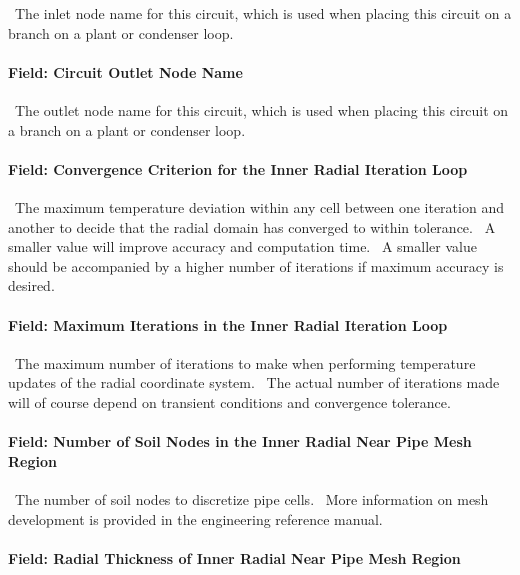 ~The inlet node name for this circuit, which is used when placing this circuit on a branch on a plant or condenser loop.

\paragraph{Field: Circuit Outlet Node Name}\label{field-circuit-outlet-node-name}

~The outlet node name for this circuit, which is used when placing this circuit on a branch on a plant or condenser loop.

\paragraph{Field: Convergence Criterion for the Inner Radial Iteration Loop}\label{field-convergence-criterion-for-the-inner-radial-iteration-loop}

~The maximum temperature deviation within any cell between one iteration and another to decide that the radial domain has converged to within tolerance.~ A smaller value will improve accuracy and computation time.~ A smaller value should be accompanied by a higher number of iterations if maximum accuracy is desired.

\paragraph{Field: Maximum Iterations in the Inner Radial Iteration Loop}\label{field-maximum-iterations-in-the-inner-radial-iteration-loop}

~The maximum number of iterations to make when performing temperature updates of the radial coordinate system.~ The actual number of iterations made will of course depend on transient conditions and convergence tolerance.

\paragraph{Field: Number of Soil Nodes in the Inner Radial Near Pipe Mesh Region}\label{field-number-of-soil-nodes-in-the-inner-radial-near-pipe-mesh-region}

~The number of soil nodes to discretize pipe cells.~ More information on mesh development is provided in the engineering reference manual.

\paragraph{Field: Radial Thickness of Inner Radial Near Pipe Mesh Region}\label{field-radial-thickness-of-inner-radial-near-pipe-mesh-region}

